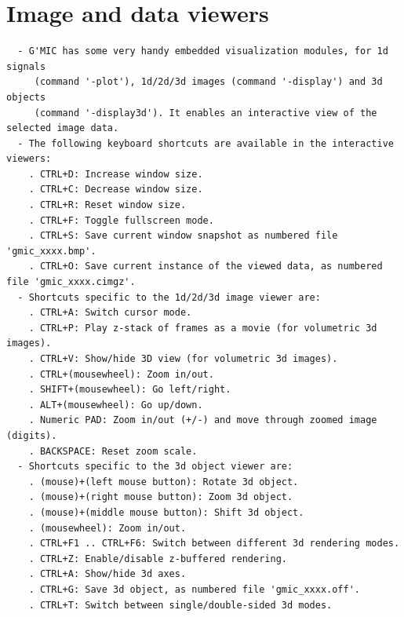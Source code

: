 \documentclass[a4paper,11pt,twoside]{book}
\begin{document}
\section{Image and data viewers}
\small
\begin{lstlisting}
  - G'MIC has some very handy embedded visualization modules, for 1d signals 
     (command '-plot'), 1d/2d/3d images (command '-display') and 3d objects 
     (command '-display3d'). It enables an interactive view of the selected image data. 
  - The following keyboard shortcuts are available in the interactive viewers: 
    . CTRL+D: Increase window size. 
    . CTRL+C: Decrease window size. 
    . CTRL+R: Reset window size. 
    . CTRL+F: Toggle fullscreen mode. 
    . CTRL+S: Save current window snapshot as numbered file 'gmic_xxxx.bmp'. 
    . CTRL+O: Save current instance of the viewed data, as numbered file 'gmic_xxxx.cimgz'. 
  - Shortcuts specific to the 1d/2d/3d image viewer are: 
    . CTRL+A: Switch cursor mode. 
    . CTRL+P: Play z-stack of frames as a movie (for volumetric 3d images). 
    . CTRL+V: Show/hide 3D view (for volumetric 3d images). 
    . CTRL+(mousewheel): Zoom in/out. 
    . SHIFT+(mousewheel): Go left/right. 
    . ALT+(mousewheel): Go up/down. 
    . Numeric PAD: Zoom in/out (+/-) and move through zoomed image (digits). 
    . BACKSPACE: Reset zoom scale. 
  - Shortcuts specific to the 3d object viewer are: 
    . (mouse)+(left mouse button): Rotate 3d object. 
    . (mouse)+(right mouse button): Zoom 3d object. 
    . (mouse)+(middle mouse button): Shift 3d object. 
    . (mousewheel): Zoom in/out. 
    . CTRL+F1 .. CTRL+F6: Switch between different 3d rendering modes. 
    . CTRL+Z: Enable/disable z-buffered rendering. 
    . CTRL+A: Show/hide 3d axes. 
    . CTRL+G: Save 3d object, as numbered file 'gmic_xxxx.off'. 
    . CTRL+T: Switch between single/double-sided 3d modes.
\end{lstlisting}
\normalsize
\end{document}
